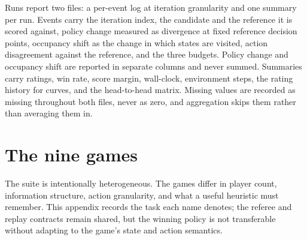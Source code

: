Runs report two files: a per-event log at iteration granularity and one summary per run.
Events carry the iteration index, the candidate and the reference it is scored against,
policy change measured as divergence at fixed reference decision points, occupancy shift
as the change in which states are visited, action disagreement against the reference,
and the three budgets. Policy change and occupancy shift are reported in separate
columns and never summed. Summaries carry ratings, win rate, score margin, wall-clock,
environment steps, the rating history for curves, and the head-to-head matrix. Missing
values are recorded as missing throughout both files, never as zero, and aggregation
skips them rather than averaging them in.

\section{The nine games}
\label{app:games}

The suite is intentionally heterogeneous. The games differ in player count, information
structure, action granularity, and what a useful heuristic must remember. This appendix
records the task each name denotes; the referee and replay contracts remain shared, but
the winning policy is not transferable without adapting to the game's state and action
semantics.


